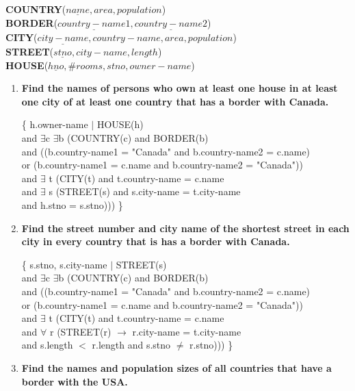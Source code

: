 \documentclass[11pt]{article}
\begin{document}
\begin{enumerate}
\begin{center}
\textbf{COUNTRY}($\underline{name}, area, population$) \\
\textbf{BORDER}($\underline{country-name1}, \underline{country-name2}$) \\
\textbf{CITY}($\underline{city-name}, country-name, area, population$) \\
\textbf{STREET}($\underline{stno}, city-name, length$) \\
\textbf{HOUSE}($\underline{hno}, \#rooms, stno, owner-name$) \\
\end{center}

\begin{enumerate}
	
	\item \textbf{Find the names of persons who own at least one house in at least one city of at least one country that has a border with Canada.}
	
	\{ h.owner-name $\vert$ HOUSE(h) \\
	and $\exists$c $\exists$b (COUNTRY(c) and BORDER(b) \\
		and ((b.country-name1 = "Canada" and b.country-name2 = c.name) \\
		or (b.country-name1 = c.name and b.country-name2 = "Canada")) \\
	and $\exists$ t (CITY(t) and t.country-name = c.name \\
	and $\exists$ s (STREET(s) and s.city-name = t.city-name \\
	and h.stno = s.stno))) \}
	
	\item \textbf{Find the street number and city name of the shortest street in each city in every country that is has a border with Canada.}
	
	\{ s.stno, s.city-name $\vert$ STREET(s) \\
	and $\exists$c $\exists$b (COUNTRY(c) and BORDER(b) \\
	and ((b.country-name1 = "Canada" and b.country-name2 = c.name) \\
	or (b.country-name1 = c.name and b.country-name2 = "Canada")) \\
	and $\exists$ t (CITY(t) and t.country-name = c.name \\
	and $\forall$ r 
	(STREET(r) $\rightarrow$ r.city-name = t.city-name \\
	and s.length $<$ r.length and s.stno $\neq$ r.stno))) \}
	
	\item \textbf{Find the names and population sizes of all countries that have a border with the USA.}
	

\end{enumerate}
\end{enumerate}
\end{document}
